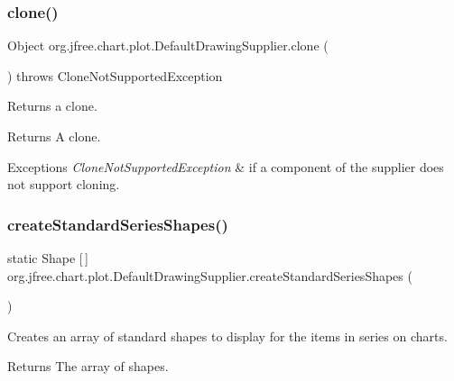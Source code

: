 \subsubsection{\texorpdfstring{clone()}{clone()}}
{\footnotesize\ttfamily Object org.\+jfree.\+chart.\+plot.\+Default\+Drawing\+Supplier.\+clone (\begin{DoxyParamCaption}{ }\end{DoxyParamCaption}) throws Clone\+Not\+Supported\+Exception}

Returns a clone.

\begin{DoxyReturn}{Returns}
A clone.
\end{DoxyReturn}

\begin{DoxyExceptions}{Exceptions}
{\em Clone\+Not\+Supported\+Exception} & if a component of the supplier does not support cloning. \\
\hline
\end{DoxyExceptions}
\mbox{\label{classorg_1_1jfree_1_1chart_1_1plot_1_1_default_drawing_supplier_acea88e7c31a41a5952a45b556a6a044d}} 
\subsubsection{\texorpdfstring{create\+Standard\+Series\+Shapes()}{createStandardSeriesShapes()}}
{\footnotesize\ttfamily static Shape \mbox{[}$\,$\mbox{]} org.\+jfree.\+chart.\+plot.\+Default\+Drawing\+Supplier.\+create\+Standard\+Series\+Shapes (\begin{DoxyParamCaption}{ }\end{DoxyParamCaption})\hspace{0.3cm}{\ttfamily [static]}}

Creates an array of standard shapes to display for the items in series on charts.

\begin{DoxyReturn}{Returns}
The array of shapes. 
\end{DoxyReturn}
\mbox{\label{classorg_1_1jfree_1_1chart_1_1plot_1_1_default_drawing_supplier_aae7d6a304e9b4285d429232d710614ad}} 
